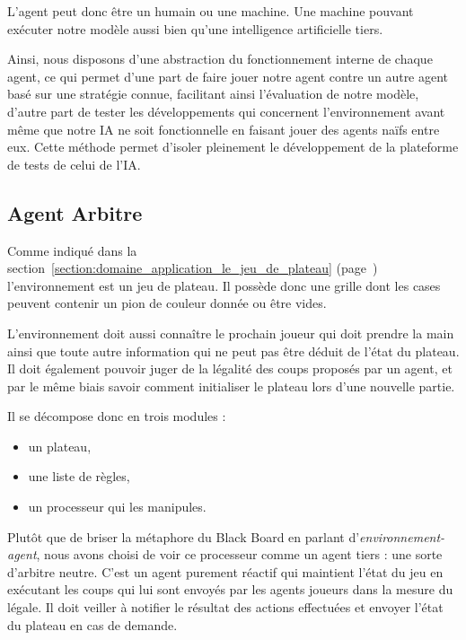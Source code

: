 L'agent peut donc être un humain ou une machine. Une machine pouvant exécuter notre modèle aussi bien qu'une intelligence artificielle tiers. 

Ainsi, nous disposons d'une abstraction du fonctionnement interne de chaque agent, ce qui permet d'une part de faire jouer notre agent contre un autre agent basé sur une stratégie connue, facilitant ainsi l'évaluation de notre modèle, d'autre part de tester les développements qui concernent l'environnement avant même que notre IA ne soit fonctionnelle en faisant jouer des agents naïfs entre eux. Cette méthode permet d'isoler pleinement le développement de la plateforme de tests de celui de l'IA.

\subsection{ Agent \og Arbitre \fg{} }

Comme indiqué dans la section~\ref{section:domaine_application_le_jeu_de_plateau} (page~\pageref{section:domaine_application_le_jeu_de_plateau}) l'environnement est un jeu de plateau. Il possède donc une grille dont les cases peuvent contenir un pion de couleur donnée ou être vides.

L'environnement doit aussi connaître le prochain joueur qui doit prendre la main ainsi que toute autre information qui ne peut pas être déduit de l'état du plateau. Il doit également pouvoir juger de la légalité des coups proposés par un agent, et par le même biais savoir comment initialiser le plateau lors d'une nouvelle partie.

Il se décompose donc en trois modules :
\begin{itemize}
\item un plateau,
\item une liste de règles,
\item un processeur qui les manipules.
\end{itemize}

Plutôt que de briser la métaphore du \og Black Board \fg{} en parlant d'\emph{environnement-agent}, nous avons choisi de voir ce processeur comme un agent tiers : une sorte d'arbitre neutre. C'est un agent purement réactif qui maintient l'état du jeu en exécutant les coups qui lui sont envoyés par les agents joueurs dans la mesure du légale. Il doit veiller à notifier le résultat des actions effectuées et envoyer l'état du plateau en cas de demande.

